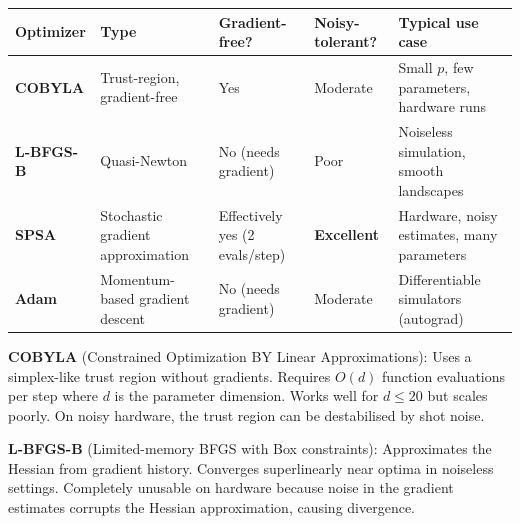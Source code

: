 \documentclass[
  11pt,
]{report}
\newcounter{none} %
\begin{document}
{\def\LTcaptype{none} %
\begin{longtable}[]{@{}
  >{\raggedright\arraybackslash}p{}
  >{\raggedright\arraybackslash}p{}
  >{\raggedright\arraybackslash}p{}
  >{\raggedright\arraybackslash}p{}
  >{\raggedright\arraybackslash}p{}@{}}
\toprule\noalign{}
\begin{minipage}[b]{\linewidth}\raggedright
Optimizer
\end{minipage} & \begin{minipage}[b]{\linewidth}\raggedright
Type
\end{minipage} & \begin{minipage}[b]{\linewidth}\raggedright
Gradient-free?
\end{minipage} & \begin{minipage}[b]{\linewidth}\raggedright
Noisy-tolerant?
\end{minipage} & \begin{minipage}[b]{\linewidth}\raggedright
Typical use case
\end{minipage} \\
\midrule\noalign{}
\endhead
\bottomrule\noalign{}
\endlastfoot
\textbf{COBYLA} & Trust-region, gradient-free & Yes & Moderate & Small
\(p\), few parameters, hardware runs \\
\textbf{L-BFGS-B} & Quasi-Newton & No (needs gradient) & Poor &
Noiseless simulation, smooth landscapes \\
\textbf{SPSA} & Stochastic gradient approximation & Effectively yes (2
evals/step) & \textbf{Excellent} & Hardware, noisy estimates, many
parameters \\
\textbf{Adam} & Momentum-based gradient descent & No (needs gradient) &
Moderate & Differentiable simulators (autograd) \\
\end{longtable}
}

\textbf{COBYLA} (Constrained Optimization BY Linear Approximations):
Uses a simplex-like trust region without gradients. Requires \(O(d)\)
function evaluations per step where \(d\) is the parameter dimension.
Works well for \(d \leq 20\) but scales poorly. On noisy hardware, the
trust region can be destabilised by shot noise.

\textbf{L-BFGS-B} (Limited-memory BFGS with Box constraints):
Approximates the Hessian from gradient history. Converges superlinearly
near optima in noiseless settings. Completely unusable on hardware
because noise in the gradient estimates corrupts the Hessian
approximation, causing divergence.
\end{document}
